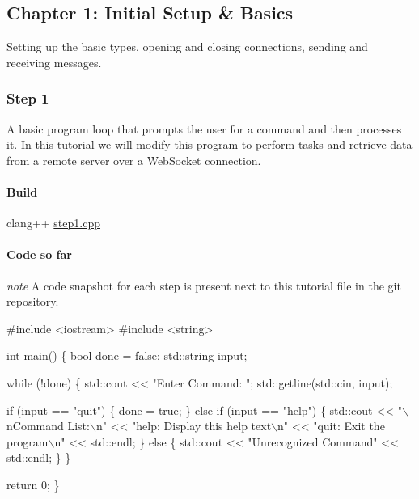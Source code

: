 \subsection*{Chapter 1\+: Initial Setup \& Basics }

Setting up the basic types, opening and closing connections, sending and receiving messages.

\subsubsection*{Step 1}

A basic program loop that prompts the user for a command and then processes it. In this tutorial we will modify this program to perform tasks and retrieve data from a remote server over a Web\+Socket connection.

\paragraph*{Build}

{\ttfamily clang++ \hyperlink{step1_8cpp_source}{step1.\+cpp}}

\paragraph*{Code so far}

{\itshape note} A code snapshot for each step is present next to this tutorial file in the git repository.


\begin{DoxyCode}
\textcolor{preprocessor}{#include <iostream>}
\textcolor{preprocessor}{#include <string>}

\textcolor{keywordtype}{int} main() \{
    \textcolor{keywordtype}{bool} done = \textcolor{keyword}{false};
    std::string input;

    \textcolor{keywordflow}{while} (!done) \{
        std::cout << \textcolor{stringliteral}{"Enter Command: "};
        std::getline(std::cin, input);

        \textcolor{keywordflow}{if} (input == \textcolor{stringliteral}{"quit"}) \{
            done = \textcolor{keyword}{true};
        \} \textcolor{keywordflow}{else} \textcolor{keywordflow}{if} (input == \textcolor{stringliteral}{"help"}) \{
            std::cout
                << \textcolor{stringliteral}{"\(\backslash\)nCommand List:\(\backslash\)n"}
                << \textcolor{stringliteral}{"help: Display this help text\(\backslash\)n"}
                << \textcolor{stringliteral}{"quit: Exit the program\(\backslash\)n"}
                << std::endl;
        \} \textcolor{keywordflow}{else} \{
            std::cout << \textcolor{stringliteral}{"Unrecognized Command"} << std::endl;
        \}
    \}

    \textcolor{keywordflow}{return} 0;
\}
\end{DoxyCode}


